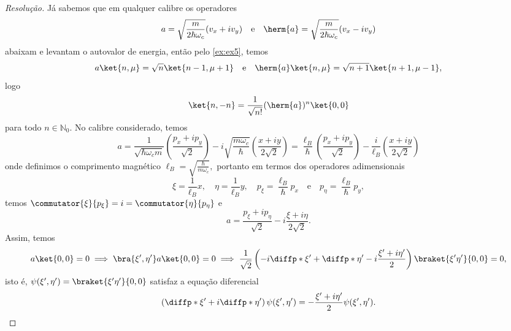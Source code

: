 \begin{proof}[Resolução]
   Já sabemos que em qualquer calibre os operadores
   \begin{equation*}
      a = \sqrt{\frac{m}{2 \hbar \omega_c}} (v_x + i v_y)
      \quad\text{e}\quad
      \herm{a} = \sqrt{\frac{m}{2 \hbar \omega_c}} (v_x - i v_y)
   \end{equation*}
   abaixam e levantam o autovalor de energia, então pelo \cref{ex:ex5}, temos
   \begin{equation*}
      a \ket{n,\mu} = \sqrt{n} \ket{n-1, \mu + 1}\quad\text{e}\quad \herm{a}\ket{n,\mu} = \sqrt{n+1} \ket{n+1, \mu - 1},
   \end{equation*}
   logo
   \begin{equation*}
      \ket{n, -n} = \frac{1}{\sqrt{n!}} (\herm{a})^n \ket{0,0}
   \end{equation*}
   para todo \(n \in \mathbb{N}_0\). No calibre considerado, temos
   \begin{equation*}
      a = \frac{1}{\sqrt{\hbar \omega_c m}} \left(\frac{p_x + i p_y}{\sqrt{2}}\right) - i\sqrt{\frac{m \omega_c}{\hbar}} \left(\frac{x + iy}{2\sqrt{2}}\right) = \frac{\ell_B}{\hbar} \left(\frac{p_x + i p_y}{\sqrt{2}}\right) - \frac{i}{\ell_B}\left(\frac{x + i y}{2\sqrt{2}}\right) 
   \end{equation*}
   onde definimos o comprimento magnético \(\ell_B = \sqrt{\frac{\hbar}{m \omega_c}},\) portanto em termos dos operadores adimensionais
   \begin{equation*}
      \xi = \frac{1}{\ell_B}x,\quad
      \eta = \frac{1}{\ell_B}y,\quad
      p_\xi = \frac{\ell_B}{\hbar}p_x\quad\text{e}\quad
      p_\eta = \frac{\ell_B}{\hbar}p_y,
   \end{equation*}
   temos \(\commutator{\xi}{p_\xi} = i = \commutator{\eta}{p_\eta}\) e 
   \begin{equation*}
      a = \frac{p_\xi + i p_\eta}{\sqrt{2}} - i\frac{\xi + i \eta}{2\sqrt{2}}.
   \end{equation*}
   Assim, temos
   \begin{equation*}
      a\ket{0,0} = 0 \implies \bra{\xi',\eta'}a\ket{0,0} = 0 \implies \frac{1}{\sqrt{2}}\left(-i\diffp*{}{\xi'} + \diffp*{}{\eta'} -i \frac{\xi' + i \eta'}{2}\right)\braket{\xi'\eta'}{0,0} = 0,
   \end{equation*}
   isto é, \(\psi(\xi', \eta') = \braket{\xi'\eta'}{0,0}\) satisfaz a equação diferencial
   \begin{equation*}
      \left(\diffp*{}{\xi'} + i \diffp*{}{\eta'}\right)\psi(\xi', \eta') = -\frac{\xi' + i \eta'}{2} \psi(\xi', \eta').
   \end{equation*}

\end{proof}
